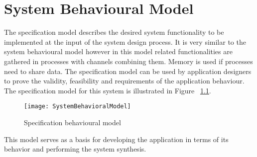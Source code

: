 
\chapter{System Behavioural Model}
\label{cha:sysBehMod}

The specification model describes the desired system functionality to be implemented at the input of the system design process. It is very similar to the system behavioural model however in this model related functionalities are gathered in processes with channels combining them. Memory is used if processes need to share data. The specification model can be used by application designers to prove the validity, feasibility and requirements of the application behaviour.
The specification model for this system is illustrated in Figure ~\ref{fig:SpecificationModel}.

\begin{figure}[H]
\centering
\texttt{[image: SystemBehavioralModel]}
\caption{Specification behavioural model}
\label{fig:SpecificationModel}
\end{figure}


This model serves as a basis for developing the application in terms of its behavior and performing the system synthesis.